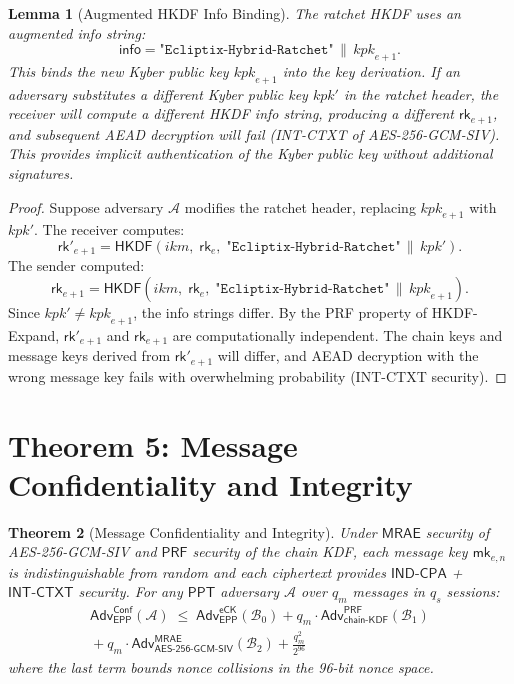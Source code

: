 \documentclass[11pt,a4paper]{article}
\newtheorem{theorem}{Theorem}[section]
\newtheorem{lemma}[theorem]{Lemma}
\theoremstyle{definition}
\theoremstyle{remark}
\newcommand{\ppt}{\mathsf{PPT}}
\newcommand{\adv}{\mathsf{Adv}}
\newcommand{\advA}{\mathcal{A}}
\newcommand{\advB}{\mathcal{B}}
\newcommand{\HKDF}{\mathsf{HKDF}}
\newcommand{\AEAD}{\mathsf{AES\text{-}256\text{-}GCM\text{-}SIV}}
\newcommand{\INDCPA}{\mathsf{IND\text{-}CPA}}
\newcommand{\INTCTXT}{\mathsf{INT\text{-}CTXT}}
\newcommand{\MRAE}{\mathsf{MRAE}}
\newcommand{\PRF}{\mathsf{PRF}}
\newcommand{\eCK}{\mathsf{eCK}}
\newcommand{\rk}{\mathsf{rk}}
\newcommand{\mk}{\mathsf{mk}}
\newcommand{\concat}{\,\|\,}
\begin{document}
\begin{lemma}[Augmented HKDF Info Binding]
\label{lem:augmented-info}
The ratchet HKDF uses an augmented info string:
\[
  \mathsf{info} = \texttt{"Ecliptix-Hybrid-Ratchet"} \concat \mathit{kpk}_{e+1}.
\]
This binds the new Kyber public key $\mathit{kpk}_{e+1}$ into the key
derivation.  If an adversary substitutes a different Kyber public key
$\mathit{kpk}'$ in the ratchet header, the receiver will compute a different
HKDF info string, producing a different $\rk_{e+1}$, and subsequent AEAD
decryption will fail (INT-CTXT of AES-256-GCM-SIV).  This provides implicit
authentication of the Kyber public key without additional signatures.
\end{lemma}

\begin{proof}
Suppose adversary $\advA$ modifies the ratchet header, replacing
$\mathit{kpk}_{e+1}$ with $\mathit{kpk}'$.  The receiver computes:
\[
  \rk'_{e+1} = \HKDF(\mathit{ikm},\; \rk_e,\;
    \texttt{"Ecliptix-Hybrid-Ratchet"} \concat \mathit{kpk}').
\]
The sender computed:
\[
  \rk_{e+1} = \HKDF(\mathit{ikm},\; \rk_e,\;
    \texttt{"Ecliptix-Hybrid-Ratchet"} \concat \mathit{kpk}_{e+1}).
\]
Since $\mathit{kpk}' \neq \mathit{kpk}_{e+1}$, the info strings differ.
By the PRF property of HKDF-Expand, $\rk'_{e+1}$ and $\rk_{e+1}$ are
computationally independent.  The chain keys and message keys derived from
$\rk'_{e+1}$ will differ, and AEAD decryption with the wrong message key
fails with overwhelming probability (INT-CTXT security). \qedhere
\end{proof}


\section{Theorem 5: Message Confidentiality and Integrity}
\label{sec:thm5}

\begin{theorem}[Message Confidentiality and Integrity]
\label{thm:conf-int}
Under $\MRAE$ security of AES-256-GCM-SIV and $\PRF$ security of the
chain KDF, each message key $\mk_{e,n}$ is indistinguishable from random
and each ciphertext provides $\INDCPA$ + $\INTCTXT$ security.
For any $\ppt$ adversary $\advA$ over $q_m$ messages in $q_s$ sessions:
\begin{multline*}
  \adv^{\mathsf{Conf}}_{\mathsf{EPP}}(\advA)
  \;\leq\;
  \adv^{\eCK}_{\mathsf{EPP}}(\advB_0) +
  q_m \cdot \adv^{\PRF}_{\mathsf{chain\text{-}KDF}}(\advB_1) \\
  {} + q_m \cdot \adv^{\MRAE}_{\AEAD}(\advB_2) +
  \frac{q_m^2}{2^{96}}
\end{multline*}
where the last term bounds nonce collisions in the 96-bit nonce space.
\end{theorem}
\end{document}
